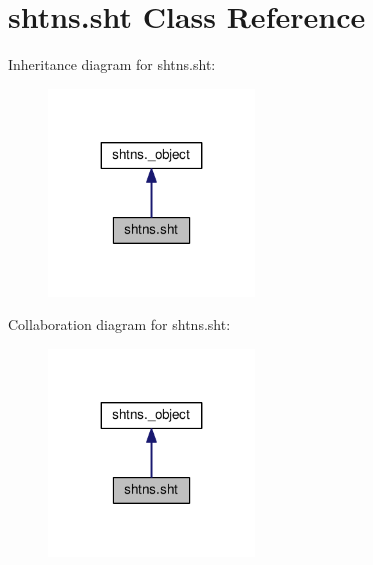 \hypertarget{classshtns_1_1sht}{}\section{shtns.\+sht Class Reference}
\label{classshtns_1_1sht}


Inheritance diagram for shtns.\+sht\+:
\nopagebreak
\begin{figure}[H]
\begin{center}
\leavevmode
\includegraphics[width=155pt]{classshtns_1_1sht__inherit__graph}
\end{center}
\end{figure}


Collaboration diagram for shtns.\+sht\+:
\nopagebreak
\begin{figure}[H]
\begin{center}
\leavevmode
\includegraphics[width=155pt]{classshtns_1_1sht__coll__graph}
\end{center}
\end{figure}
